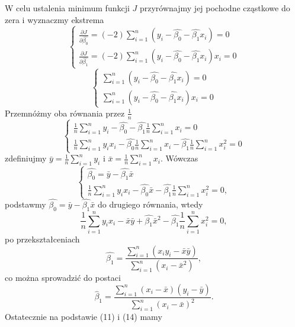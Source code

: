 \documentclass[a4paper]{article}
\begin{document}
W celu ustalenia minimum funkcji $J$ przyrównajmy jej pochodne cząstkowe do zera i wyznaczmy ekstrema
\begin{equation}
\left\{ \begin{array}{ll}
\frac{\partial{J}}{\partial{\hat{\beta_0}}} = (-2) \sum\limits_{i=1}^n{({y}_i - \hat{\beta_0} - \hat{\beta_1}x_i)} = 0 \\
\frac{\partial{J}}{\partial{\hat{\beta_1}}} = (-2) \sum\limits_{i=1}^n{({y}_i - \hat{\beta_0} - \hat{\beta_1}x_i)x_i} = 0
\end{array} \right.
\end{equation}
\begin{equation}
\left\{ \begin{array}{ll}
\sum\limits_{i=1}^n{({y}_i - \hat{\beta_0} - \hat{\beta_1}x_i)} = 0 \\
\sum\limits_{i=1}^n{({y}_i - \hat{\beta_0} - \hat{\beta_1}x_i)x_i} = 0
\end{array} \right.
\end{equation}
Przemnóżmy oba równania przez $\frac{1}{n}$
\begin{equation}
\left\{ \begin{array}{ll}
\frac{1}{n}\sum\limits_{i=1}^n{{y}_i} - \hat{\beta_0} - \hat{\beta_1}\frac{1}{n}\sum\limits_{i=1}^n{ x_i} = 0 \\

\frac{1}{n}\sum\limits_{i=1}^n{{y}_i x_i} - \hat{\beta_0}\frac{1}{n}\sum\limits_{i=1}^n{ x_i} - \hat{\beta_1}\frac{1}{n}\sum\limits_{i=1}^n{ x_i^2} = 0
\end{array} \right.
\end{equation}
zdefiniujmy $\bar{y} = \frac{1}{n}\sum\limits_{i=1}^n{{y}_i}$ i  $\bar{x} = \frac{1}{n}\sum\limits_{i=1}^n{x_i}$. Wówczas
\begin{equation}\label{eq:(3.10)}
\left\{ \begin{array}{ll}
 \hat{\beta_0} =\bar{y} - \hat{\beta_1}\bar{x}  \\

\frac{1}{n}\sum\limits_{i=1}^n{{y}_i x_i} - \hat{\beta_0}\bar{x} - \hat{\beta_1}\frac{1}{n}\sum\limits_{i=1}^n{ x_i^2} = 0,
\end{array} \right.
\end{equation}
podstawmy  $\hat{\beta_0} =\bar{y} - \hat{\beta_1}\bar{x}$ do drugiego równania, wtedy
\begin{equation}
    \frac{1}{n}\sum\limits_{i=1}^n{{y}_i x_i} - \bar{x}\bar{y} + \hat{\beta_1}\bar{x}^2-\hat{\beta_1}\frac{1}{n}\sum\limits_{i=1}^n{ x_i^2}=0,
\end{equation}
po przekształceniach
\begin{equation}
    \hat{\beta_1} = \frac{\sum\limits_{i=1}^n{(x_i y_i - \bar{x}\bar{y})}}{\sum\limits_{i=1}^n{(x_i - \bar{x}^2)}},
\end{equation}
co można sprowadzić do postaci 
\begin{equation}\label{eq:(3.13)}
    \hat{\beta}_1 = \frac{\sum\limits_{i=1}^n{(x_i - \bar{x})(y_i - \bar{y})}}{\sum\limits_{i=1}^n{(x_i - \bar{x})^2}}.
\end{equation}
Ostatecznie na podstawie {(11)} i  {(14)} mamy
\end{document}

